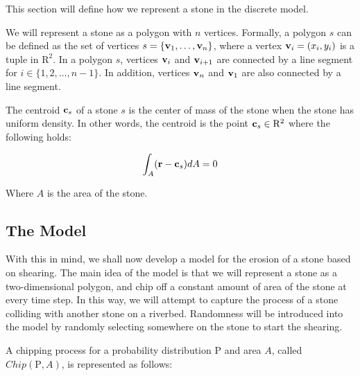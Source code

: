 This section will define how we represent a stone in the discrete model.

We will represent a stone as a polygon with $n$ vertices. Formally, a polygon $s$ can be defined as the set of vertices $s = \{ \mathbf{v}_1, \ldots, \mathbf{v}_n \}$, where a vertex $\mathbf{v}_i = (x_i, y_i)$ is a tuple in $\mathrm{R}^2$. In a polygon $s$, vertices $\mathbf{v}_i$ and $\mathbf{v}_{i+1}$ are connected by a line segment for $i \in \{1,2, \ldots, n-1\}$. In addition, vertices $\mathbf{v}_{n}$ and $\mathbf{v}_1$ are also connected by a line segment.

The centroid $\mathbf{c}_s$ of a stone $s$ is the center of mass of the stone when the stone has uniform density. In other words, the centroid is the point $\mathbf{c}_s \in \mathrm{R}^2$ where the following holds:

\begin{eqnarray}
 \int_A (\mathbf{r} - \mathbf{c}_s) dA = 0
\end{eqnarray}

Where $A$ is the area of the stone.

\subsection{The Model}

With this in mind, we shall now develop a model for the erosion of a stone based on shearing. The main idea of the model is that we will represent a stone as a two-dimensional polygon, and chip off a constant amount of area of the stone at every time step. In this way, we will attempt to capture the process of a stone colliding with another stone on a riverbed. Randomness will be introduced into the model by randomly selecting somewhere on the stone to start the shearing.

A chipping process for a probability distribution $\mathrm{P}$ and area $A$, called $Chip(\mathrm{P}, A)$, is represented as follows:

